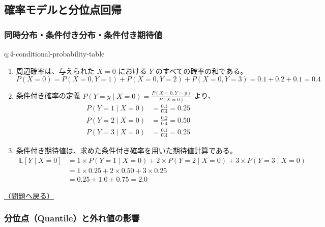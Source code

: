 \documentclass[
  pandoc]{bxjsarticle}
\providecommand{\tightlist}{%
  \setlength{\itemsep}{0pt}\setlength{\parskip}{0pt}}
\begin{document}
\subsection{確率モデルと分位点回帰}\label{ux78baux7387ux30e2ux30c7ux30ebux3068ux5206ux4f4dux70b9ux56deux5e30-1}

\subsubsection{同時分布・条件付き分布・条件付き期待値}\label{ux540cux6642ux5206ux5e03ux6761ux4ef6ux4ed8ux304dux5206ux5e03ux6761ux4ef6ux4ed8ux304dux671fux5f85ux5024-1}

\begin{answerbox}[phantomlabel=a:4-conditional-probability-table]{q:4-conditional-probability-table}

\begin{enumerate}
\def\labelenumi{\arabic{enumi}.}
\tightlist
\item
  周辺確率は、与えられた \(X=0\) における \(Y\)
  のすべての確率の和である。 \[
       P(X=0) = P(X=0, Y=1) + P(X=0, Y=2) + P(X=0, Y=3) = 0.1 + 0.2 + 0.1 = 0.4
       \]
\item
  条件付き確率の定義 \(P(Y=y \mid X=0) = \frac{P(X=0, Y=y)}{P(X=0)}\)
  より、 \begin{align*}
       P(Y=1 \mid X=0) &= \frac{0.1}{0.4} = 0.25 \\
       P(Y=2 \mid X=0) &= \frac{0.2}{0.4} = 0.50 \\
       P(Y=3 \mid X=0) &= \frac{0.1}{0.4} = 0.25
       \end{align*}
\item
  条件付き期待値は、求めた条件付き確率を用いた期待値計算である。
  \begin{align*}
       \mathbb{E}[Y \mid X=0] &= 1 \times P(Y=1 \mid X=0) + 2 \times P(Y=2 \mid X=0) + 3 \times P(Y=3 \mid X=0) \\
       &= 1 \times 0.25 + 2 \times 0.50 + 3 \times 0.25 \\
       &= 0.25 + 1.0 + 0.75 = 2.0
       \end{align*}
\end{enumerate}

\hfill 

\hyperref[q:4-conditional-probability-table]{（問題へ戻る）}

\end{answerbox}

\subsubsection{分位点（Quantile）と外れ値の影響}\label{ux5206ux4f4dux70b9quantileux3068ux5916ux308cux5024ux306eux5f71ux97ff-1}
\end{document}
